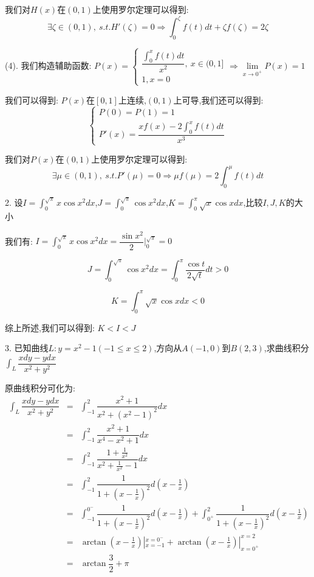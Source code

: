 \begin{solution}
	我们对$H(x)$在$(0,1)$上使用罗尔定理可以得到:  
	$$\exists \zeta\in(0,1),\ s.t. H'(\zeta)=0\Rightarrow \int_{0}^{\zeta}f(t)dt+\zeta f(\zeta)=2\zeta$$
	
	(4). 我们构造辅助函数:  $P(x)=\left\lbrace
	\begin{array}{l}
		\dfrac{\int_{0}^{x}f(t)dt}{x^2},\ x\in(0,1]\\
		1,x=0
	\end{array}
	\right. \Rightarrow \lim\limits_{x\rightarrow 0^{+}}P(x)=1$
	
	我们可以得到:  $P(x)$在$[0,1]$上连续,$(0,1)$上可导,我们还可以得到:  
	$$\left\lbrace
	\begin{array}{l}
		P(0)=P(1)=1\\
		P'(x)=\dfrac{xf(x)-2\int_{0}^{x}f(t)dt}{x^3}
	\end{array}
	\right. $$
	
	我们对$P(x)$在$(0,1)$上使用罗尔定理可以得到:  
	$$\exists \mu\in(0,1),\ s.t. P'(\mu)=0\Rightarrow \mu f(\mu)=2\int_{0}^{\mu}f(t)dt$$
\end{solution}

2. 设$I=\int_{0}^{\sqrt{\pi}}x\cos x^2dx$,$J=\int_{0}^{\sqrt{\pi}}\cos x^2dx$,$K=\int_{0}^{\pi}\sqrt{x}\cos xdx$,比较$I,J,K$的大小
\begin{solution}

	我们有:  $I=\int_{0}^{\sqrt{\pi}}x\cos x^2dx=\dfrac{\sin x^2}{2}|_{0}^{\sqrt{\pi}}=0$
	
	$$J=\int_{0}^{\sqrt{\pi}}\cos x^2dx=\int_{0}^{\pi}\dfrac{\cos t}{2\sqrt{t}}dt>0$$
	
	$$K=\int_{0}^{\pi}\sqrt{x}\cos xdx<0$$
	
	综上所述,我们可以得到:  $K<I<J$
\end{solution}

3. 已知曲线$L: y=x^2-1(-1\leq x\leq 2)$,方向从$A(-1,0)$到$B(2,3)$,求曲线积分$\int_{L}\dfrac{xdy-ydx}{x^2+y^2}$
\begin{solution}

	原曲线积分可化为:  
	\begin{eqnarray*}
		\int_{L}\dfrac{xdy-ydx}{x^2+y^2}&=&\int_{-1}^{2}\dfrac{x^2+1}{x^2+(x^2-1)^2}dx\\
		&=&\int_{-1}^{2}\dfrac{x^2+1}{x^4-x^2+1}dx\\
		&=&\int_{-1}^{2}\dfrac{1+\frac{1}{x^2}}{x^2+\frac{1}{x^2}-1}dx\\
		&=&\int_{-1}^{2}\dfrac{1}{1+(x-\frac{1}{x})^2}d(x-\frac{1}{x})\\
		&=&\int_{-1}^{0^{-}}\dfrac{1}{1+(x-\frac{1}{x})^2}d(x-\frac{1}{x})+\int_{0^{+}}^{2}\dfrac{1}{1+(x-\frac{1}{x})^2}d(x-\frac{1}{x})\\
		&=&\arctan(x-\frac{1}{x})|_{x=-1}^{x=0^{-}}+\arctan(x-\frac{1}{x})|_{x=0^{+}}^{x=2}\\
		&=&\arctan\dfrac{3}{2}+\pi
	\end{eqnarray*}
\end{solution}

